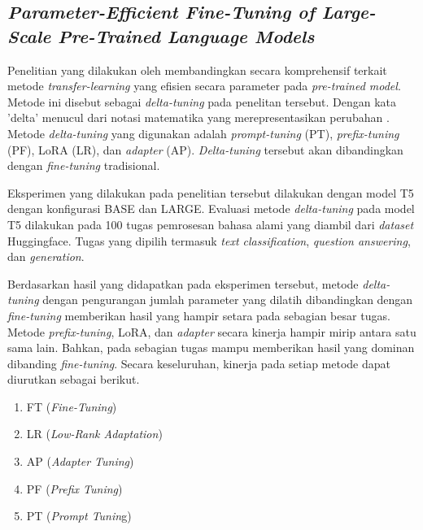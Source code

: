 \subsection{\textit{Parameter-Efficient Fine-Tuning of Large-Scale
Pre-Trained Language Models}}

Penelitian yang dilakukan oleh \citeauthor{peft_on_plm} membandingkan secara komprehensif terkait metode \textit{transfer-learning} yang efisien secara parameter pada \textit{pre-trained model}. Metode ini disebut sebagai \textit{delta-tuning} pada penelitan tersebut. Dengan kata 'delta' menucul dari notasi matematika yang merepresentasikan perubahan \parencite{peft_on_plm}. Metode \textit{delta-tuning} yang digunakan adalah \textit{prompt-tuning} (PT), \textit{prefix-tuning} (PF), LoRA (LR), dan \textit{adapter} (AP). \textit{Delta-tuning} tersebut akan dibandingkan dengan \textit{fine-tuning} tradisional.

Eksperimen yang dilakukan pada penelitian tersebut dilakukan dengan model T5 dengan konfigurasi BASE dan LARGE. Evaluasi metode \textit{delta-tuning} pada model T5 dilakukan pada 100 tugas pemrosesan bahasa alami yang diambil dari \textit{dataset} Huggingface. Tugas yang dipilih termasuk \textit{text classification}, \textit{question answering}, dan \textit{generation}.

Berdasarkan hasil yang didapatkan pada eksperimen tersebut, metode \textit{delta-tuning} dengan pengurangan jumlah parameter yang dilatih dibandingkan dengan \textit{fine-tuning} memberikan hasil yang hampir setara pada sebagian besar tugas. Metode \textit{prefix-tuning}, LoRA, dan \textit{adapter} secara kinerja hampir mirip antara satu sama lain. Bahkan, pada sebagian tugas mampu memberikan hasil yang dominan dibanding \textit{fine-tuning}. Secara keseluruhan, kinerja pada setiap metode dapat diurutkan sebagai berikut.

\begin{enumerate}
    \item FT (\textit{Fine-Tuning})
    \item LR (\textit{Low-Rank Adaptation})
    \item AP (\textit{Adapter Tuning})
    \item PF (\textit{Prefix Tuning})
    \item PT (\textit{Prompt Tunin}g)
\end{enumerate}
